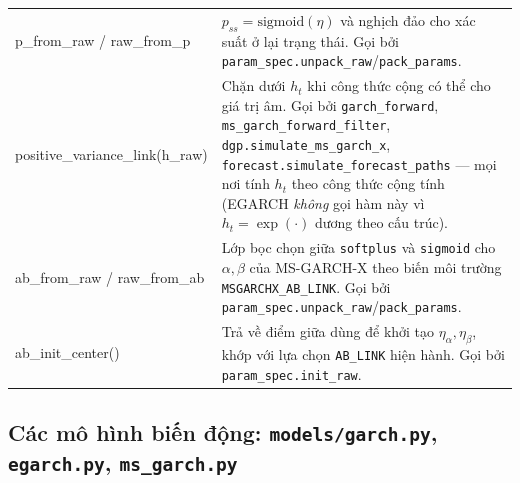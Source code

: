 \documentclass[11pt,a4paper]{article}
\newcommand{\code}[1]{\texttt{#1}}
\newcommand{\file}[1]{\texttt{#1}}
\begin{document}
\begin{longtable}{@{}>{\ttfamily\scriptsize\raggedright\arraybackslash}p{5.0cm} >{\raggedright\arraybackslash}p{9.5cm}@{}}
p\_from\_raw / raw\_from\_p & $p_{ss}=\mathrm{sigmoid}(\eta)$ và nghịch đảo cho xác suất ở lại trạng thái. Gọi bởi \code{param\_spec.unpack\_raw}/\code{pack\_params}. \\
positive\_variance\_link(h\_raw) & Chặn dưới $h_t$ khi công thức cộng có thể cho giá trị âm. Gọi bởi \code{garch\_forward}, \code{ms\_garch\_forward\_filter}, \code{dgp.simulate\_ms\_garch\_x}, \code{forecast.simulate\_forecast\_paths} --- mọi nơi tính $h_t$ theo công thức cộng tính (EGARCH \emph{không} gọi hàm này vì $h_t=\exp(\cdot)$ dương theo cấu trúc). \\
ab\_from\_raw / raw\_from\_ab & Lớp bọc chọn giữa \code{softplus} và \code{sigmoid} cho $\alpha,\beta$ của MS-GARCH-X theo biến môi trường \code{MSGARCHX\_AB\_LINK}. Gọi bởi \code{param\_spec.unpack\_raw}/\code{pack\_params}. \\
ab\_init\_center() & Trả về điểm giữa dùng để khởi tạo $\eta_\alpha,\eta_\beta$, khớp với lựa chọn \code{AB\_LINK} hiện hành. Gọi bởi \code{param\_spec.init\_raw}. \\
\end{longtable}

\subsection{Các mô hình biến động: \file{models/garch.py}, \file{egarch.py}, \file{ms\_garch.py}}
\label{sec:models-catalog}
\end{document}
